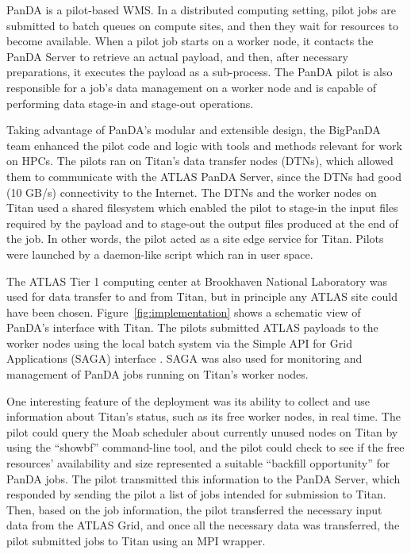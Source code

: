 PanDA is a pilot-based WMS. In a distributed computing setting, pilot jobs are
submitted to batch queues on compute sites, and then they wait for resources to
become available. When a pilot job starts on a worker node, it contacts the
PanDA Server to retrieve an actual payload, and then, after necessary
preparations, it executes the payload as a sub-process. The PanDA pilot is also
responsible for a job's data management on a worker node and is capable of
performing data stage-in and stage-out operations.

Taking advantage of PanDA's modular and extensible design, the BigPanDA team
enhanced the pilot code and logic with tools and methods relevant for work on
HPCs. The pilots ran on Titan's data transfer nodes (DTNs), which allowed them
to communicate with the ATLAS PanDA Server, since the DTNs had good (10 GB/s)
connectivity to the Internet. The DTNs and the worker nodes on Titan used a
shared filesystem which enabled the pilot to stage-in the input files required
by the payload and to stage-out the output files produced at the end of the
job. In other words, the pilot acted as a site edge service for Titan. Pilots
were launched by a daemon-like script which ran in user space.

The ATLAS Tier 1 computing center at Brookhaven National Laboratory was used
for data transfer to and from Titan, but in principle any ATLAS site could have
been chosen. Figure~\ref{fig:implementation} shows a schematic view of PanDA's
interface with Titan. The pilots submitted ATLAS payloads to the worker nodes
using the local batch system via the Simple API for Grid Applications (SAGA)
interface \cite{saga_cmst}. SAGA was also used for monitoring and
management of PanDA jobs running on Titan's worker nodes.

One interesting feature of the deployment was its ability to collect and use
information about Titan's status, such as its free worker nodes, in real time.
The pilot could query the Moab scheduler about currently unused nodes on Titan
by using the ``showbf'' command-line tool, and the pilot could check to see if
the free resources' availability and size represented a suitable ``backfill
opportunity'' for PanDA jobs. The pilot transmitted this information to the
PanDA Server, which responded by sending the pilot a list of jobs intended for
submission to Titan. Then, based on the job information, the pilot transferred
the necessary input data from the ATLAS Grid, and once all the necessary data
was transferred, the pilot submitted jobs to Titan using an MPI wrapper. 

